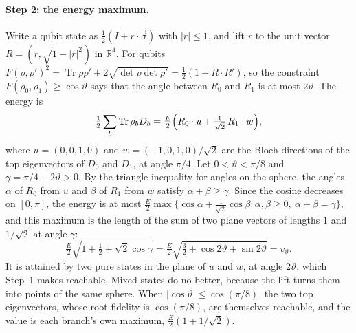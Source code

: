 \documentclass[11pt]{article}
\theoremstyle{definition}
\theoremstyle{remark}
\newcommand{\Tr}{\operatorname{Tr}}
\begin{document}
\paragraph{Step 2: the energy maximum.} Write a qubit state as $\tfrac12(I+r\cdot\vec\sigma)$ with $|r|\le1$, and lift $r$ to the unit vector $R=(r,\sqrt{1-|r|^2})$ in $\mathbb R^4$. For qubits $F(\rho,\rho')^2=\Tr\rho\rho'+2\sqrt{\det\rho\det\rho'}=\tfrac12(1+R\cdot R')$, so the constraint $F(\rho_0,\rho_1)\ge\cos\vartheta$ says that the angle between $R_0$ and $R_1$ is at most $2\vartheta$. The energy is
\[
\tfrac12\sum_b\Tr\rho_bD_b=\tfrac E2\Bigl(R_0\cdot u+\tfrac1{\sqrt2}\,R_1\cdot w\Bigr),
\]
where $u=(0,0,1,0)$ and $w=(-1,0,1,0)/\sqrt2$ are the Bloch directions of the top eigenvectors of $D_0$ and $D_1$, at angle $\pi/4$. Let $0<\vartheta<\pi/8$ and $\gamma=\pi/4-2\vartheta>0$. By the triangle inequality for angles on the sphere, the angles $\alpha$ of $R_0$ from $u$ and $\beta$ of $R_1$ from $w$ satisfy $\alpha+\beta\ge\gamma$. Since the cosine decreases on $[0,\pi]$, the energy is at most $\tfrac E2\max\{\cos\alpha+\tfrac1{\sqrt2}\cos\beta:\alpha,\beta\ge0,\ \alpha+\beta=\gamma\}$, and this maximum is the length of the sum of two plane vectors of lengths $1$ and $1/\sqrt2$ at angle $\gamma$:
\[
\tfrac E2\sqrt{1+\tfrac12+\sqrt2\cos\gamma}=\tfrac E2\sqrt{\tfrac32+\cos2\vartheta+\sin2\vartheta}=v_\vartheta.
\]
It is attained by two pure states in the plane of $u$ and $w$, at angle $2\vartheta$, which Step~1 makes reachable. Mixed states do no better, because the lift turns them into points of the same sphere. When $|\cos\vartheta|\le\cos(\pi/8)$, the two top eigenvectors, whose root fidelity is $\cos(\pi/8)$, are themselves reachable, and the value is each branch's own maximum, $\tfrac E2(1+1/\sqrt2)$.
\end{document}

